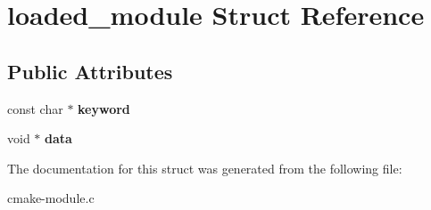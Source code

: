 \hypertarget{structloaded__module}{\section{loaded\-\_\-module Struct Reference}
\label{structloaded__module}
}
\subsection*{Public Attributes}
\begin{DoxyCompactItemize}
\item 
\hypertarget{structloaded__module_af6a6318fb18586616fe47b4703b21b85}{const char $\ast$ {\bfseries keyword}}\label{structloaded__module_af6a6318fb18586616fe47b4703b21b85}

\item 
\hypertarget{structloaded__module_a21f159922cffba0840b923d5badea19b}{void $\ast$ {\bfseries data}}\label{structloaded__module_a21f159922cffba0840b923d5badea19b}

\end{DoxyCompactItemize}


The documentation for this struct was generated from the following file\-:\begin{DoxyCompactItemize}
\item 
cmake-\/module.\-c\end{DoxyCompactItemize}
